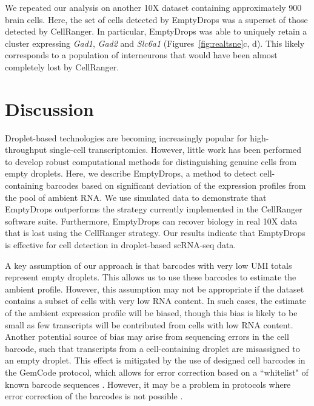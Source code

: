 \documentclass[10pt,letterpaper]{article}
\begin{document}
We repeated our analysis on another 10X dataset containing approximately 900 brain cells.
Here, the set of cells detected by EmptyDrops was a superset of those detected by CellRanger.
In particular, EmptyDrops was able to uniquely retain a cluster expressing \textit{Gad1}, \textit{Gad2} and \textit{Slc6a1} (Figures~\ref{fig:realtsne}c, d).
This likely corresponds to a population of interneurons that would have been almost completely lost by CellRanger.

\section*{Discussion}
Droplet-based technologies are becoming increasingly popular for high-throughput single-cell transcriptomics.
However, little work has been performed to develop robust computational methods for distinguishing genuine cells from empty droplets.
Here, we describe EmptyDrops, a method to detect cell-containing barcodes based on significant deviation of the expression profiles from the pool of ambient RNA.
We use simulated data to demonstrate that EmptyDrops outperforms the strategy currently implemented in the CellRanger software suite.
Furthermore, EmptyDrops can recover biology in real 10X data that is lost using the CellRanger strategy.
Our results indicate that EmptyDrops is effective for cell detection in droplet-based scRNA-seq data.

A key assumption of our approach is that barcodes with very low UMI totals represent empty droplets.
This allows us to use these barcodes to estimate the ambient profile.
However, this assumption may not be appropriate if the dataset contains a subset of cells with very low RNA content.
In such cases, the estimate of the ambient expression profile will be biased, though this bias is likely to be small as few transcripts will be contributed from cells with low RNA content.
Another potential source of bias may arise from sequencing errors in the cell barcode, such that transcripts from a cell-containing droplet are misassigned to an empty droplet.
This effect is mitigated by the use of designed cell barcodes in the GemCode protocol, which allows for error correction based on a ``whitelist" of known barcode sequences \cite{zheng2017massively}.
However, it may be a problem in protocols where error correction of the barcodes is not possible \cite{macosko2015highly}.

\end{document}
